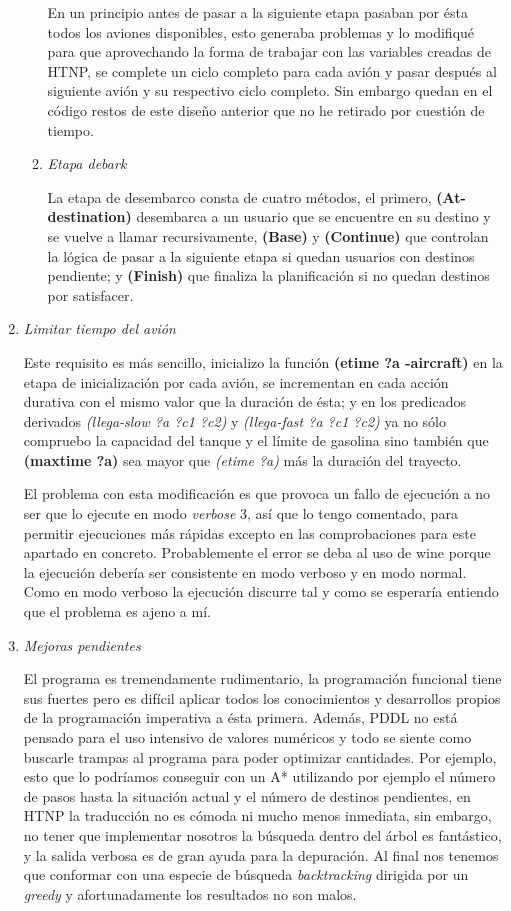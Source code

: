\documentclass{article}
\begin{document}
\begin{enumerate}
\begin{enumerate}
		En un principio antes de pasar a la siguiente etapa pasaban por ésta todos los aviones disponibles, esto generaba problemas y lo modifiqué para que aprovechando la forma de trabajar con las variables creadas de HTNP, se complete un ciclo completo para cada avión y pasar después al siguiente avión y su respectivo ciclo completo. Sin embargo quedan en el código restos de este diseño anterior que no he retirado por cuestión de tiempo.
		
		\item \emph{Etapa debark}
		
		La etapa de desembarco consta de cuatro métodos, el primero, \textbf{(At-destination)} desembarca a un usuario que se encuentre en su destino y se vuelve a llamar recursivamente, \textbf{(Base)} y \textbf{(Continue)} que controlan la lógica de pasar a la siguiente etapa si quedan usuarios con destinos pendiente; y \textbf{(Finish)} que finaliza la planificación si no quedan destinos por satisfacer.
		
	\end{enumerate}

	\item \emph{Limitar tiempo del avión}
	
	Este requisito es más sencillo, inicializo la función \textbf{(etime ?a -aircraft)} en la etapa de inicialización por cada avión, se incrementan en cada acción durativa con el mismo valor que la duración de ésta; y en los predicados derivados \emph{(llega-slow ?a ?c1 ?c2)} y \emph{(llega-fast ?a ?c1 ?c2)} ya no sólo compruebo la capacidad del tanque y el límite de gasolina sino también que \textbf{(maxtime ?a)} sea mayor que \emph{(etime ?a)} más la duración del trayecto.
	
	El problema con esta modificación es que provoca un fallo de ejecución a no ser que lo ejecute en modo \emph{verbose} 3, así que lo tengo comentado, para permitir ejecuciones más rápidas excepto en las comprobaciones para este apartado en concreto. Probablemente el error se deba al uso de wine porque la ejecución debería ser consistente en modo verboso y en modo normal. Como en modo verboso la ejecución discurre tal y como se esperaría entiendo que el problema es ajeno a mí.
	
	\item \emph{Mejoras pendientes}
	
	El programa es tremendamente rudimentario, la programación funcional tiene sus fuertes pero es difícil aplicar todos los conocimientos y desarrollos propios de la programación imperativa a ésta primera. Además, PDDL no está pensado para el uso intensivo de valores numéricos y todo se siente como buscarle trampas al programa para poder optimizar cantidades. Por ejemplo, esto que lo podríamos conseguir con un A* utilizando por ejemplo el número de pasos hasta la situación actual y el número de destinos pendientes, en HTNP la traducción no es cómoda ni mucho menos inmediata, sin embargo, no tener que implementar nosotros la búsqueda dentro del árbol es fantástico, y la salida verbosa es de gran ayuda para la depuración. Al final nos tenemos que conformar con una especie de búsqueda \emph{backtracking} dirigida por un \emph{greedy} y afortunadamente los resultados no son malos.
	

\end{enumerate}
\end{document}
